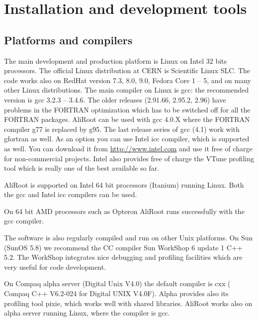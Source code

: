 \documentclass[12pt,a4paper,twoside]{article}
\begin{document}

\newpage 
\section{Installation and development tools}\label{Installation}


\subsection{Platforms and compilers}

The main development and production platform is Linux on Intel 32 bits
processors.  The official  Linux\cite{Linux} distribution  at  CERN is
Scientific   Linux    SLC\cite{SLC}.   The   code    works   also   on
RedHat\cite{RedHat} version 7.3,  8.0, 9.0, Fedora Core\cite{Fedora} 1
-- 5,  and on  many other  Linux distributions.  The main  compiler on
Linux  is  gcc\cite{gcc}: the  recommended  version  is  gcc 3.2.3  --
3.4.6. The older releases (2.91.66, 2.95.2, 2.96) have problems in the
FORTRAN optimization which has to  be switched off for all the FORTRAN
packages.  AliRoot  can be  used  with  gcc  4.0.X where  the  FORTRAN
compiler g77 is replaced by g95.  The last release series of gcc (4.1)
work  with  gfortran  as  well.   As  an  option  you  can  use  Intel
icc\cite{icc} compiler,  which is supported as well.  You can download
it  from \url{http://www.intel.com}  and  use it  free  of charge  for
non-commercial  projects.  Intel  also  provides free  of  charge  the
VTune\cite{VTune}  profiling tool  which  is really  one  of the  best
available so far.

AliRoot    is     supported    on    Intel     64    bit    processors
(Itanium\cite{Itanium})  running Linux.  Both  the gcc  and Intel  icc
compilers can be used.

On  64  bit AMD\cite{AMD}  processors  such  as  Opteron AliRoot  runs
successfully with the gcc compiler.

The  software  is  also  regularly  compiled and  run  on  other  Unix
platforms.  On  Sun (SunOS  5.8)  we  recommend  the CC  compiler  Sun
WorkShop 6  update 1 C++  5.2. The WorkShop integrates  nice debugging
and profiling facilities which are very useful for code development.

On Compaq alpha server (Digital Unix V4.0) the default compiler is cxx
( Compaq C++ V6.2-024 for Digital UNIX V4.0F). Alpha provides also its
profiling tool pixie, which  works well with shared libraries. AliRoot
works also on alpha server running Linux, where the compiler is gcc.
\end{document}
